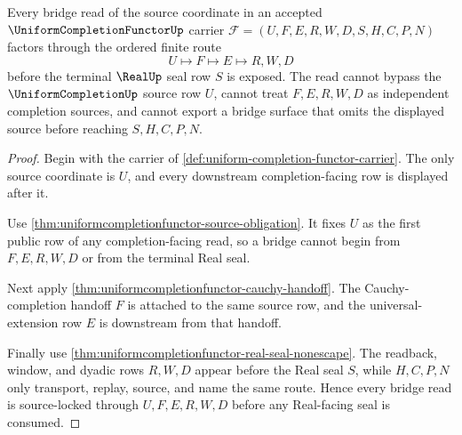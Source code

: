 \begin{theorem}
\label{thm:uniform-completion-functor-bridge-source-lock}
Every bridge read of the source coordinate in an accepted $\UniformCompletionFunctorUp$ carrier $\mathcal{F}=(U,F,E,R,W,D,S,H,C,P,N)$ factors through the ordered finite route
$$
U \longmapsto F \longmapsto E \longmapsto R,W,D
$$
before the terminal $\RealUp$ seal row $S$ is exposed. The read cannot bypass the $\UniformCompletionUp$ source row $U$, cannot treat $F,E,R,W,D$ as independent completion sources, and cannot export a bridge surface that omits the displayed source before reaching $S,H,C,P,N$.
\end{theorem}
\begin{proof}
Begin with the carrier of \autoref{def:uniform-completion-functor-carrier}. The only source coordinate is $U$, and every downstream completion-facing row is displayed after it.

Use \autoref{thm:uniformcompletionfunctor-source-obligation}. It fixes $U$ as the first public row of any completion-facing read, so a bridge cannot begin from $F,E,R,W,D$ or from the terminal Real seal.

Next apply \autoref{thm:uniformcompletionfunctor-cauchy-handoff}. The Cauchy-completion handoff $F$ is attached to the same source row, and the universal-extension row $E$ is downstream from that handoff.

Finally use \autoref{thm:uniformcompletionfunctor-real-seal-nonescape}. The readback, window, and dyadic rows $R,W,D$ appear before the Real seal $S$, while $H,C,P,N$ only transport, replay, source, and name the same route. Hence every bridge read is source-locked through $U,F,E,R,W,D$ before any Real-facing seal is consumed.
\end{proof}



